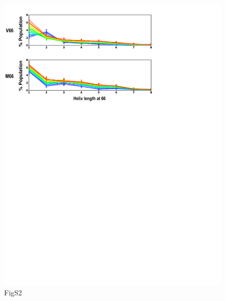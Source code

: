 \documentclass[10pt,letterpaper]{article}
\begin{document}
\begin{figure}[!ht]
\includegraphics[scale=0.5,width=\textwidth,trim={0 0cm 0 0cm},clip]{./figures/S2.pdf}
\caption{{FigS2}}
\end{figure}
\end{document}
